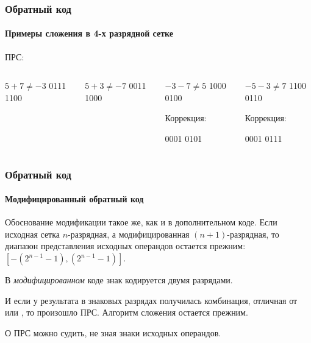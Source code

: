 \begin{frame}
    \frametitle{Обратный код}
    \framesubtitle{Примеры сложения в 4-х разрядной сетке}
    
    ПРС:
    \begin{columns}
            \begin{block}{$5+7\neq -3$}
                 \center
                          {0111}
                          {1100}
            \end{block}
            \begin{block}{$5+3\neq -7$}
                 \center
                          {0011}
                          {1000}
            \end{block}
            \begin{block}{$-3-7\neq 5$}
                 \center
                          {1000}
                          {0100}
                          
                 Коррекция:
                 
                          {0001}
                          {0101}
            \end{block}
            \begin{block}{$-5-3\neq 7$}
                 \center
                          {1100}
                          {0110}
                          
                 Коррекция:
                 
                          {0001}
                          {0111}
            \end{block}
    \end{columns}
\end{frame}

\begin{frame}
    \frametitle{Обратный код}
    \framesubtitle{Модифицированный обратный код}
    
    Обоснование модификации такое же, как и в дополнительном коде. Если исходная сетка $n$-разрядная, а модифицированная $(n+1)$-разрядная, то диапазон представления исходных операндов остается прежним:$[-(2^{n-1} - 1),(2^{n-1} - 1)]$. 
    
    \begin{block}{}
        В \emph{модифицированном} коде знак кодируется двумя разрядами.
    \end{block}

    И если у результата в знаковых разрядах получилась комбинация, отличная от  или , то произошло ПРС. Алгоритм сложения остается прежним.
    
    \begin{block}{}
        О ПРС можно судить, не зная знаки исходных операндов.
    \end{block}
\end{frame}

